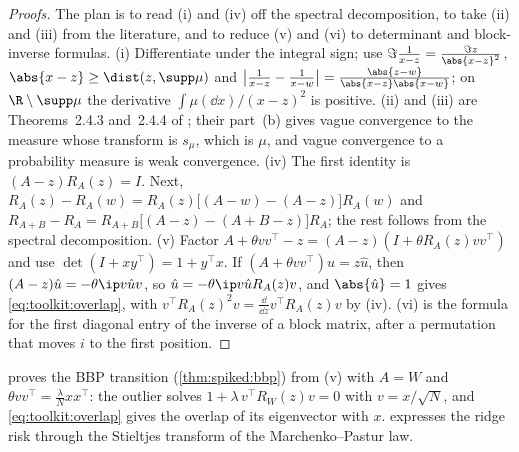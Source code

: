 \begin{refsection}
\begin{proof}[Proofs]
The plan is to read (i) and (iv) off the spectral decomposition, to take (ii) and (iii) from the literature, and to reduce (v) and (vi) to determinant and block-inverse formulas. (i) Differentiate under the integral sign; use $\Im\frac1{x-z}=\frac{\Im z}{\abs{x-z}^2}$, $\abs{x-z}\ge\dist(z,\supp\mu)$ and $\bigl\lvert\frac1{x-z}-\frac1{x-w}\bigr\rvert=\frac{\abs{z-w}}{\abs{x-z}\abs{x-w}}$; on $\R\setminus\supp\mu$ the derivative $\int\mu(\dd x)/(x-z)^2$ is positive. (ii) and (iii) are Theorems~2.4.3 and~2.4.4 of \textcite{AndersonGuionnetZeitouni2010}; their part~(b) gives vague convergence to the measure whose transform is $s_\mu$, which is $\mu$, and vague convergence to a probability measure is weak convergence. (iv) The first identity is $(A-z)R_A(z)=I$. Next, $R_A(z)-R_A(w)=R_A(z)\bigl[(A-w)-(A-z)\bigr]R_A(w)$ and $R_{A+B}-R_A=R_{A+B}\bigl[(A-z)-(A+B-z)\bigr]R_A$; the rest follows from the spectral decomposition. (v) Factor $A+\theta vv^\top-z=(A-z)(I+\theta R_A(z)vv^\top)$ and use $\det(I+xy^\top)=1+y^\top x$. If $(A+\theta vv^\top)\hat u=z\hat u$, then $(A-z)\hat u=-\theta\ip v{\hat u}v$, so $\hat u=-\theta\ip v{\hat u}R_A(z)v$, and $\abs{\hat u}=1$ gives \eqref{eq:toolkit:overlap}, with $v^\top R_A(z)^2v=\frac{\dd}{\dd z}v^\top R_A(z)v$ by (iv). (vi) is the formula for the first diagonal entry of the inverse of a block matrix, after a permutation that moves $i$ to the first position.
\end{proof}

 proves the BBP transition (\cref{thm:spiked:bbp}) from (v) with $A=W$ and $\theta vv^\top=\frac\lambda Nxx^\top$: the outlier solves $1+\lambda\,v^\top R_W(z)v=0$ with $v=x/\sqrt N$, and \eqref{eq:toolkit:overlap} gives the overlap of its eigenvector with $x$.  expresses the ridge risk through the Stieltjes transform of the Marchenko--Pastur law.


\end{refsection}
